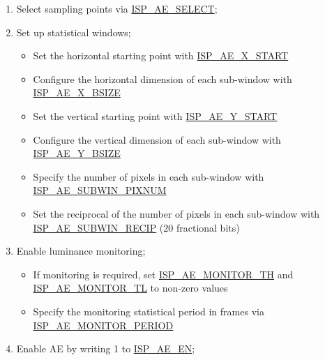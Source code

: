 \documentclass[main\_\_EN.tex]{subfiles}
\begin{document}
\begin{enumerate}
    \item Select sampling points via \hyperref[fielddesc:ISPAESELECT]{ISP\_AE\_SELECT};

    \item Set up statistical windows;
    \begin{itemize}
        \item Set the horizontal starting point with \hyperref[fielddesc:ISPAEXSTART]{ISP\_AE\_X\_START}
        \item Configure the horizontal dimension of each sub-window with \hyperref[fielddesc:ISPAEXBSIZE]{ISP\_AE\_X\_BSIZE}
        \item Set the vertical starting point with \hyperref[fielddesc:ISPAEYSTART]{ISP\_AE\_Y\_START}
        \item Configure the vertical dimension of each sub-window with \hyperref[fielddesc:ISPAEYBSIZE]{ISP\_AE\_Y\_BSIZE}
        \item Specify the number of pixels in each sub-window with \hyperref[fielddesc:ISPAESUBWINPIXNUM]{ISP\_AE\_SUBWIN\_PIXNUM}
        \item Set the reciprocal of the number of pixels in each sub-window with \hyperref[fielddesc:ISPAESUBWINRECIP]{ISP\_AE\_SUBWIN\_RECIP} (20 fractional bits)
    \end{itemize}

    \item Enable luminance monitoring;
    \begin{itemize}
        \item If monitoring is required, set \hyperref[fielddesc:ISPAEMONITORTH]{ISP\_AE\_MONITOR\_TH} and \hyperref[fielddesc:ISPAEMONITORTL]{ISP\_AE\_MONITOR\_TL} to non-zero values
        \item Specify the monitoring statistical period in frames via \hyperref[fielddesc:ISPAEMONITORPERIOD]{ISP\_AE\_MONITOR\_PERIOD}
    \end{itemize}

    \item Enable AE by writing 1 to \hyperref[fielddesc:ISPAEEN]{ISP\_AE\_EN};


\end{enumerate}
\end{document}
